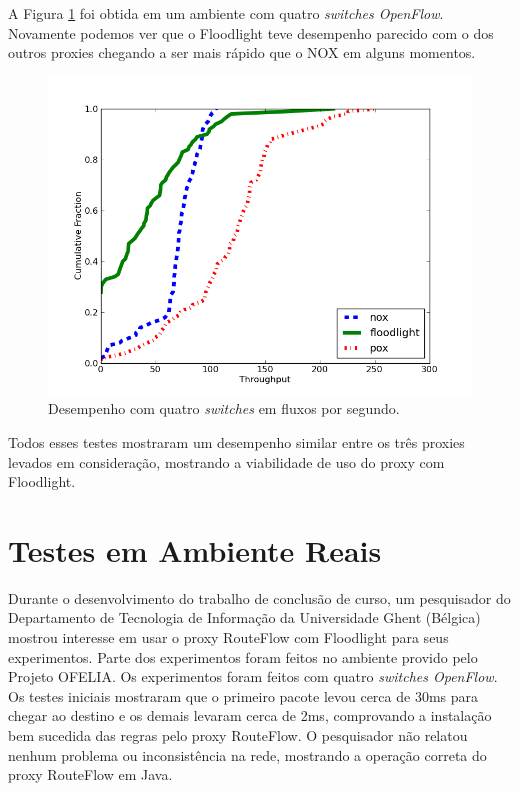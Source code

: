 A Figura \ref{fig:desempenho4sw} foi obtida em um ambiente
com quatro \textit{switches OpenFlow}. Novamente podemos
ver que o Floodlight teve desempenho parecido com o dos
outros proxies chegando a ser mais rápido que o NOX em 
alguns momentos.


\begin{figure}[h]
\centering
\includegraphics[width=140mm]{desempenho_4sw.png}
\caption{Desempenho com quatro \textit{switches} em fluxos por segundo.}
\label{fig:desempenho4sw} 
\end{figure}

Todos esses testes mostraram um desempenho similar entre
os três proxies levados em consideração, mostrando a viabilidade
de uso do proxy com Floodlight.

\section{Testes em Ambiente Reais}

Durante o desenvolvimento do trabalho de conclusão de
curso, um pesquisador do Departamento de Tecnologia de
Informação da Universidade Ghent (Bélgica) mostrou interesse
em usar o proxy RouteFlow com Floodlight para seus
experimentos. Parte dos experimentos foram feitos no ambiente
provido pelo Projeto OFELIA. Os experimentos
foram feitos com quatro \textit{switches OpenFlow}. Os testes
iniciais mostraram que o primeiro pacote levou cerca de 30ms
para chegar ao destino e os demais levaram cerca de
2ms, comprovando a instalação bem sucedida das regras pelo
proxy RouteFlow. O pesquisador não relatou nenhum 
problema ou inconsistência na rede, mostrando a operação
correta do proxy RouteFlow em Java.



